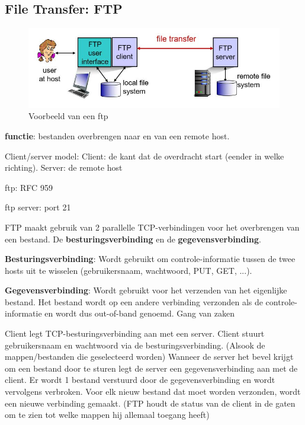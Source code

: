 \subsection{File Transfer: FTP}

\begin{figure}[h]
\centering
\includegraphics[width=4.5in]{./img/imghfdst2/ftp.jpg}
\caption{Voorbeeld van een ftp }
\label{fig:ftp}
\end{figure}

\noindent \textbf{functie}: bestanden overbrengen naar en van een remote host.

Client/server model:
\bi
\itf Client: de kant dat de overdracht start (eender in welke richting).
\itf Server: de remote host
\ei

ftp: RFC 959

ftp server: port 21

FTP maakt gebruik van 2 parallelle TCP-verbindingen voor het overbrengen van een bestand. De \textbf{besturingsverbinding} en de \textbf{gegevensverbinding}.

\textbf{Besturingsverbinding}: Wordt gebruikt om controle-informatie tussen de twee hosts uit te wisselen (gebruikersnaam, wachtwoord, PUT, GET, ...).

\textbf{Gegevensverbinding}: Wordt gebruikt voor het verzenden van het eigenlijke bestand. Het bestand wordt op een andere verbinding verzonden als de controle-informatie en wordt dus out-of-band genoemd.
Gang van zaken

\be
\itf Client legt TCP-besturingsverbinding aan met een server.
\itf Client stuurt gebruikersnaam en wachtwoord via de besturingsverbinding. (Alsook de mappen/bestanden die geselecteerd worden)
\itf Wanneer de server het bevel krijgt om een bestand door te sturen legt de server een gegevensverbinding aan met de client.
\itf Er wordt 1 bestand verstuurd door de gegevensverbinding en wordt vervolgens verbroken. Voor elk nieuw bestand dat moet worden verzonden, wordt een nieuwe verbinding gemaakt.
\itf (FTP houdt de status van de client in de gaten om te zien tot welke mappen hij allemaal toegang heeft)
\ee

